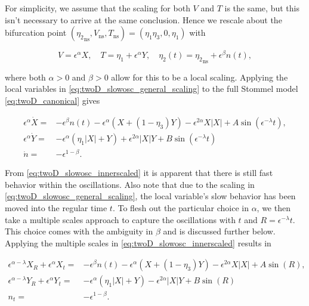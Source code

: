 \indent For simplicity, we assume that the scaling for both $V$ and $T$ is the same, but this isn't necessary to arrive at the same conclusion. Hence we rescale about the bifurcation point $({\eta_2}_{\text{ns}},V_{\text{ns}},T_{\text{ns}})=(\eta_1\eta_3,0,\eta_1)$ with

\begin{equation}\label{eq:twoD_slowosc_general_scaling}
V=\epsilon^\alpha X, \quad T=\eta_1+\epsilon^\alpha Y ,\quad \eta_2(t)={\eta_2}_{\text{ns}}+\epsilon^\beta n(t),
\end{equation}

where both $\alpha>0$ and $\beta>0$ allow for this to be a local scaling. Applying the local variables in \eqref{eq:twoD_slowosc_general_scaling} to the full Stommel model \eqref{eq:twoD_canonical} gives

\begin{equation}\label{eq:twoD_slowosc_innerscaled}
\begin{aligned}
\epsilon^\alpha \dot{X}=& -\epsilon^\beta n(t)-\epsilon^\alpha (X+(1-\eta_3)Y) - \epsilon^{2\alpha}X|X| +A\sin(\epsilon^{-\lambda}t),\\
\epsilon^\alpha \dot{Y}=&-\epsilon^\alpha(\eta_1|X|+Y)+\epsilon^{2\alpha}|X|Y +B\sin(\epsilon^{-\lambda} t)\\
\dot{n}=&-\epsilon^{1-\beta}.
\end{aligned}
\end{equation}

From \eqref{eq:twoD_slowosc_innerscaled} it is apparent that there is still fast behavior within the oscillations. Also note that due to the scaling in \eqref{eq:twoD_slowosc_general_scaling}, the local variable's slow behavior has been moved into the regular time $t$. To flesh out the particular choice in $\alpha$, we then take a multiple scales approach to capture the oscillations with $t$ and $R=\epsilon^{-\lambda}t$. This choice comes with the ambiguity in $\beta$ and is discussed further below. Applying the multiple scales in \eqref{eq:twoD_slowosc_innerscaled} results in

\begin{equation}\label{eq:twoD_slowosc_innergeneral}
\begin{aligned}
\epsilon^{\alpha-\lambda} X_R+\epsilon^{\alpha}X_t=& -\epsilon^{\beta}n(t)-\epsilon^{\alpha}(X+(1-\eta_3)Y)-\epsilon^{2\alpha}X|X|+A\sin(R),\\
\epsilon^{\alpha-\lambda}Y_R + \epsilon^{\alpha}Y_t =&- \epsilon^\alpha(\eta_1|X|+Y)-\epsilon^{2\alpha}|X|Y +B\sin(R)\\
n_t=&-\epsilon^{1-\beta}.
\end{aligned}
\end{equation}


